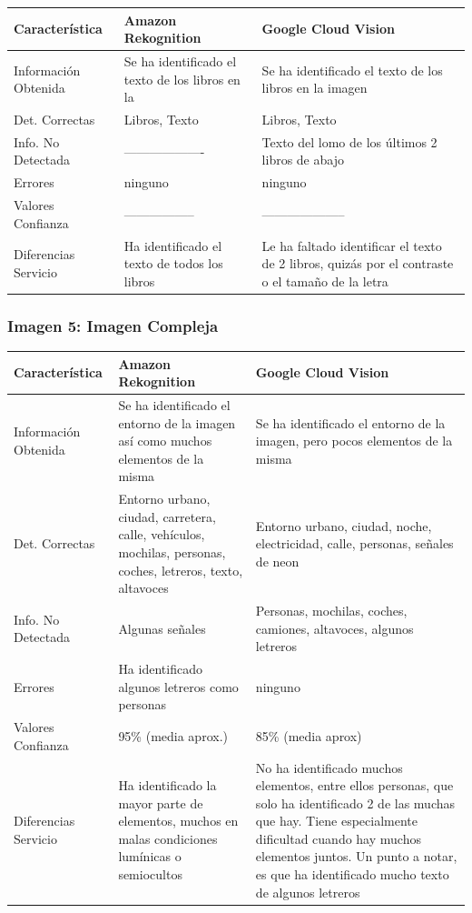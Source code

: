 \begin{center}
	\renewcommand{\arraystretch}{1.2}
	\begin{tabular}{|p{5cm}|p{5cm}|p{5cm}|}
		\hline
		\textbf{Característica} & \textbf{Amazon Rekognition} & \textbf{Google Cloud Vision} \\
		\hline
		Información Obtenida & Se ha identificado el texto de los libros en la & Se ha identificado el texto de los libros en la imagen \\
		\hline
		Det. Correctas & Libros, Texto & Libros, Texto \\
		\hline
		Info. No Detectada & ------------------- & Texto del lomo de los últimos 2 libros de abajo\\
		\hline
		Errores & ninguno & ninguno \\
		\hline
		Valores Confianza & ----------------- & -------------------- \\
		\hline
		Diferencias Servicio & Ha identificado el texto de todos los libros & Le ha faltado identificar el texto de 2 libros, quizás por el contraste o el tamaño de la letra \\
		\hline
	\end{tabular}
\end{center}

\subsubsection{Imagen 5: Imagen Compleja}


\begin{center}
	\renewcommand{\arraystretch}{1.2}
	\begin{tabular}{|p{5cm}|p{5cm}|p{5cm}|}
		\hline
		\textbf{Característica} & \textbf{Amazon Rekognition} & \textbf{Google Cloud Vision} \\
		\hline
		Información Obtenida & Se ha identificado el entorno de la imagen así como muchos elementos de la misma & Se ha identificado el entorno de la imagen, pero pocos elementos de la misma \\
		\hline
		Det. Correctas & Entorno urbano, ciudad, carretera, calle, vehículos, mochilas, personas, coches, letreros, texto, altavoces & Entorno urbano, ciudad, noche, electricidad, calle, personas, señales de neon \\
		\hline
		Info. No Detectada & Algunas señales  & Personas, mochilas, coches, camiones, altavoces, algunos letreros\\
		\hline
		Errores & Ha identificado algunos letreros como personas & ninguno \\
		\hline
		Valores Confianza & 95\% (media aprox.) & 85\% (media aprox) \\
		\hline
		Diferencias Servicio & Ha identificado la mayor parte de elementos, muchos en malas condiciones lumínicas o semiocultos & No ha identificado muchos elementos, entre ellos personas, que solo ha identificado 2 de las muchas que hay. Tiene especialmente dificultad cuando hay muchos elementos juntos. Un punto a notar, es que ha identificado mucho texto de algunos letreros \\
		\hline
	\end{tabular}
\end{center}

